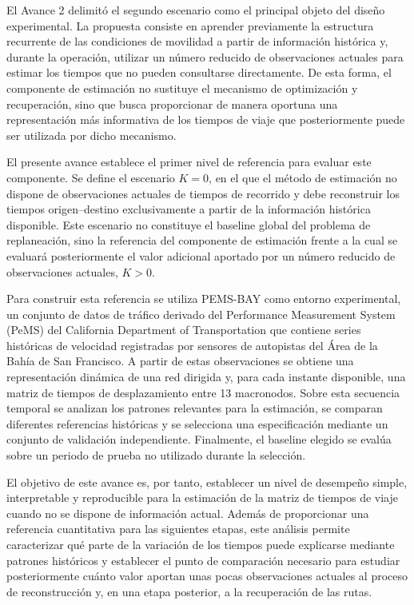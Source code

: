 \documentclass[11pt]{article}
\begin{document}
El Avance 2 delimitó el segundo escenario como el principal objeto del diseño experimental. La propuesta consiste en aprender previamente la estructura recurrente de las condiciones de movilidad a partir de información histórica y, durante la operación, utilizar un número reducido de observaciones actuales para estimar los tiempos que no pueden consultarse directamente. De esta forma, el componente de estimación no sustituye el mecanismo de optimización y recuperación, sino que busca proporcionar de manera oportuna una representación más informativa de los tiempos de viaje que posteriormente puede ser utilizada por dicho mecanismo.

El presente avance establece el primer nivel de referencia para evaluar este componente. Se define el escenario $K=0$, en el que el método de estimación no dispone de observaciones actuales de tiempos de recorrido y debe reconstruir los tiempos origen--destino exclusivamente a partir de la información histórica disponible. Este escenario no constituye el baseline global del problema de replaneación, sino la referencia del componente de estimación frente a la cual se evaluará posteriormente el valor adicional aportado por un número reducido de observaciones actuales, $K>0$.

Para construir esta referencia se utiliza PEMS-BAY como entorno experimental, un conjunto de datos de tráfico derivado del Performance Measurement System (PeMS) del California Department of Transportation que contiene series históricas de velocidad registradas por sensores de autopistas del Área de la Bahía de San Francisco. A partir de estas observaciones se obtiene una representación dinámica de una red dirigida y, para cada instante disponible, una matriz de tiempos de desplazamiento entre 13 macronodos. Sobre esta secuencia temporal se analizan los patrones relevantes para la estimación, se comparan diferentes referencias históricas y se selecciona una especificación mediante un conjunto de validación independiente. Finalmente, el baseline elegido se evalúa sobre un periodo de prueba no utilizado durante la selección.

El objetivo de este avance es, por tanto, establecer un nivel de desempeño simple, interpretable y reproducible para la estimación de la matriz de tiempos de viaje cuando no se dispone de información actual. Además de proporcionar una referencia cuantitativa para las siguientes etapas, este análisis permite caracterizar qué parte de la variación de los tiempos puede explicarse mediante patrones históricos y establecer el punto de comparación necesario para estudiar posteriormente cuánto valor aportan unas pocas observaciones actuales al proceso de reconstrucción y, en una etapa posterior, a la recuperación de las rutas.
\end{document}
